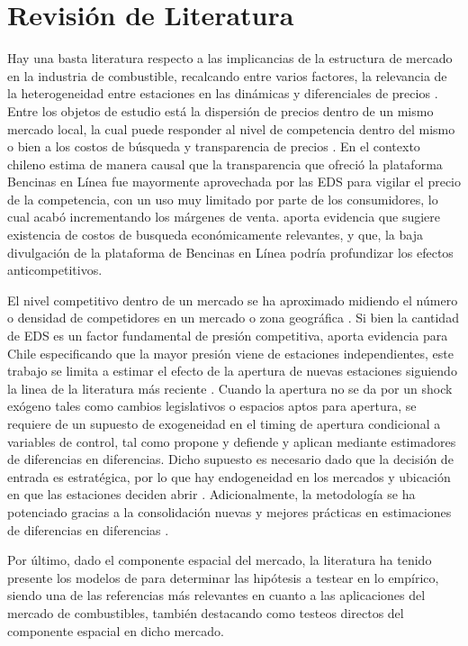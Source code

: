 \section{Revisión de Literatura} \label{sec:literatura}

Hay una basta literatura respecto a las implicancias de la estructura de mercado en la industria de combustible, recalcando entre varios factores, la relevancia de la heterogeneidad entre estaciones en las dinámicas y diferenciales de precios \parencite{ECKERT2013,HAUCAP2017,KIHM2016}. Entre los objetos de estudio está la dispersión de precios dentro de un mismo mercado local, la cual puede responder al nivel de competencia dentro del mismo \parencite{LEWIS2008} o bien a los costos de búsqueda y transparencia de precios \parencite{SOLIS2025,CHANDRA2011,BYRNE2017,LUCO2019,STIGLER1961,BORENSTEIN1991}. En el contexto chileno \textcite{LUCO2019} estima de manera causal que la transparencia que ofreció la plataforma Bencinas en Línea fue mayormente aprovechada por las EDS para vigilar el precio de la competencia, con un uso muy limitado por parte de los consumidores, lo cual acabó incrementando los márgenes de venta. \textcite{SOLIS2025} aporta evidencia que sugiere existencia de costos de busqueda económicamente relevantes, y que, la baja divulgación de la plataforma de Bencinas en Línea podría profundizar los efectos anticompetitivos.

El nivel competitivo dentro de un mercado se ha aproximado midiendo el número o densidad de competidores en un mercado o zona geográfica \parencite{VANMEERBEECK2003,SEN2003,BERGANTINO2020}. Si bien la cantidad de EDS es un factor fundamental de presión competitiva, \textcite{CASTILLO2018} aporta evidencia para Chile especificando que la mayor presión viene de estaciones independientes, este trabajo se limita a estimar el efecto de la apertura de nuevas estaciones siguiendo la linea de la literatura más reciente \textcite{FISCHER2025,DAVIS2025,KOH2022,TAYLORMUEHLEGGER2026, BERNARDO2018,CARDOSO2022}. Cuando la apertura no se da por un shock exógeno tales como cambios legislativos o espacios aptos para apertura, se requiere de un supuesto de exogeneidad en el timing de apertura condicional a variables de control, tal como propone y defiende \textcite{ARCIDIACONO2020} y aplican \textcite{FISCHER2025,TAYLORMUEHLEGGER2026} mediante estimadores de diferencias en diferencias. Dicho supuesto es necesario dado que la decisión de entrada es estratégica, por lo que hay endogeneidad en los mercados y ubicación en que las estaciones deciden abrir \parencite{HOUDE2005}. Adicionalmente, la metodología se ha potenciado gracias a la consolidación nuevas y mejores prácticas en estimaciones de diferencias en diferencias \parencite{CALLAWAYSANTANNA2021,SUNABRAHAM2021,DECHAISEMARTIN2020,BORUSYAK2024,GARDNER2024}.

Por último, dado el componente espacial del mercado, la literatura ha tenido presente los modelos de \textcite{SALOP1979,HOTELLING1929,BRESNAHAN1991} para determinar las hipótesis a testear en lo empírico, siendo \textcite{HOUDE2012} una de las referencias más relevantes en cuanto a las aplicaciones del mercado de combustibles, también destacando \textcite{CLEMENZGUGLER2006,GENAKOS2022} como testeos directos del componente espacial en dicho mercado.